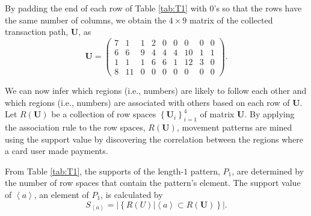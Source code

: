 \documentclass[final,authoryear,5p,times,twocolumn]{elsarticle}
\begin{document}
By padding the end of each row of Table \ref{tab:T1} with 0's so that the rows have the same number of columns, we obtain the $4 \times 9$ matrix of the collected transaction path, $\mathbf{U}$, as
\begin{equation} \label{eq:33}
\mathbf{U}=
\begin{pmatrix}
7 & 1 & 1 & 2 & 0 & 0 & 0 & 0 & 0\\ 
6 & 6 & 9 & 4 & 4 & 4 & 10 & 1 & 1\\ 
1 & 1 & 1 & 6 & 6 & 1 & 12 & 3 & 0\\ 
8 & 11 & 0 & 0 & 0 & 0 & 0 & 0 & 0
\end{pmatrix}.
\end{equation}

We can now infer which regions (i.e., numbers) are likely to follow each other and which regions (i.e., numbers) are associated with others based on each row of $\mathbf{U}$. Let $R(\mathbf{U})$ be a collection of row spaces $\left \{ \mathbf{U}_i \right \}_{i=1}^4$ of matrix $\mathbf{U}$. By applying the association rule to the row spaces, $R(\mathbf{U})$, movement patterns are mined using the support value by discovering the correlation between the regions where a card user made payments.

From Table \ref{tab:T1}, the supports of the length-$1$ pattern, $P_1$, are determined by the number of row spaces that contain the pattern's element. The support value of $\left \langle a \right \rangle$, an element of $P_1$, is calculated by
\begin{equation} \label{eq:S1}
S_{\left \langle a \right \rangle} =
\left | \left \{ R(U)|\left \langle a \right \rangle \subset R(\mathbf{U}) \right \} \right |.
\end{equation}
 
\end{document}
